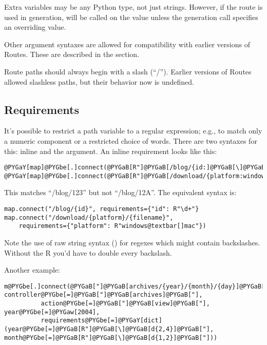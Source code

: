 \documentclass[letterpaper,10pt,english]{manual}
\begin{document}
Extra variables may be any Python type, not just strings.  However, if the
route is used in generation,  will  be called on the value unless
the generation call specifies an overriding value.

Other argument syntaxes are allowed for compatibility with earlier versions of
Routes.  These are described in the  section.

Route paths should always begin with a slash (``/'').  Earlier versions of
Routes allowed slashless paths, but their behavior now is undefined.


\subsection{Requirements}

It's possible to restrict a path variable to a regular expression; e.g., to
match only a numeric component or a restricted choice of words.  There are two
syntaxes for this: inline and the  argument.  An inline
requirement looks like this:

\begin{Verbatim}[commandchars=@\[\]]
@PYGaY[map]@PYGbe[.]connect(@PYGaB[R"]@PYGaB[/blog/{id:]@PYGaB[\]@PYGaB[d+}]@PYGaB["])
@PYGaY[map]@PYGbe[.]connect(@PYGaB[R"]@PYGaB[/download/{platform:windows@textbar[]mac}/{filename}]@PYGaB["])
\end{Verbatim}

This matches ``/blog/123'' but not ``/blog/12A''.  The equivalent 
syntax is:

\begin{Verbatim}[commandchars=@\[\]]
map.connect("/blog/{id}", requirements={"id": R"\d+"}
map.connect("/download/{platform}/{filename}",
    requirements={"platform": R"windows@textbar[]mac"})
\end{Verbatim}

Note the use of raw string syntax () for regexes which might contain
backslashes.  Without the R you'd have to double every backslash.

Another example:

\begin{Verbatim}[commandchars=@\[\]]
m@PYGbe[.]connect(@PYGaB["]@PYGaB[archives/{year}/{month}/{day}]@PYGaB["], controller@PYGbe[=]@PYGaB["]@PYGaB[archives]@PYGaB["],
          action@PYGbe[=]@PYGaB["]@PYGaB[view]@PYGaB["], year@PYGbe[=]@PYGaw[2004],
          requirements@PYGbe[=]@PYGaY[dict](year@PYGbe[=]@PYGaB[R"]@PYGaB[\]@PYGaB[d{2,4}]@PYGaB["], month@PYGbe[=]@PYGaB[R"]@PYGaB[\]@PYGaB[d{1,2}]@PYGaB["]))
\end{Verbatim}
\end{document}
